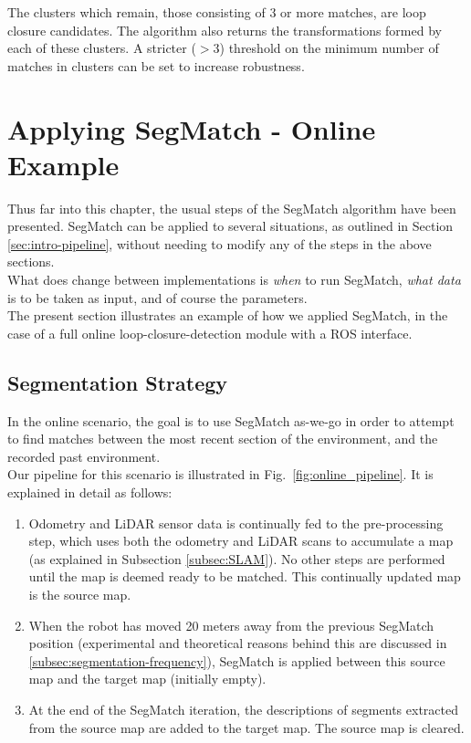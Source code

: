 The clusters which remain, those consisting of 3 or more matches, are loop closure candidates. The algorithm also returns the transformations formed by each of these clusters. A stricter ($>3$) threshold on the minimum number of matches in clusters can be set to increase robustness.\\

\section{Applying SegMatch - Online Example}
\label{sec:online}

Thus far into this chapter, the usual steps of the SegMatch algorithm have been presented. SegMatch can be applied to several situations, as outlined in Section \ref{sec:intro-pipeline}, without needing to modify any of the steps in the above sections.\\

What does change between implementations is \textit{when} to run SegMatch, \textit{what data} is to be taken as input, and of course the parameters.\\

The present section illustrates an example of how we applied SegMatch, in the case of a full online loop-closure-detection module with a ROS interface.

\subsection{Segmentation Strategy}
\label{subsec:segmentation-strategy}

In the online scenario, the goal is to use SegMatch as-we-go in order to attempt to find matches between the most recent section of the environment, and the recorded past environment.\\

Our pipeline for this scenario is illustrated in Fig.~\ref{fig:online_pipeline}. It is explained in detail as follows:

\begin{enumerate}
  \item Odometry and LiDAR sensor data is continually fed to the pre-processing step, which uses both the odometry and LiDAR scans to accumulate a map (as explained in Subsection \ref{subsec:SLAM}). No other steps are performed until the map is deemed ready to be matched. This continually updated map is the source map.
  \item When the robot has moved 20 meters away from the previous SegMatch position (experimental and theoretical reasons behind this are discussed in \ref{subsec:segmentation-frequency}), SegMatch is applied between this source map and the target map (initially empty).
\item At the end of the SegMatch iteration, the descriptions of segments extracted from the source map are added to the target map. The source map is cleared.
\end{enumerate}


